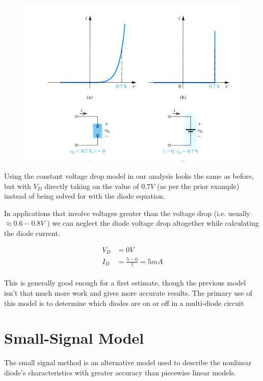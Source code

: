 \documentclass[../notes.tex]{subfiles}
\begin{document}
\begin{figure}[H]
	\centering
	\includegraphics[width=0.8\linewidth]{img/image_2022-09-16-22-49-19.png}
\end{figure}


Using the constant voltage drop model in our analysis looks the same as before, but with $ V_D $ directly taking on the value of $ 0.7V $ (as per the prior example) instead of being solved for with the diode equation.



In applications that involve voltages greater than the voltage drop (i.e. usually $ \approx 0.6-0.8V $  ) we can neglect the diode voltage drop altogether while calculating the diode current.

\begin{equation}
	\begin{split}
		V_D &= 0V \\
		 I_D &= \frac{5-0}{1} = 5mA  \\
	\end{split}
\end{equation}



This is generally good enough for a first estimate, though the previous model isn't that much more work and gives more accurate results.
The primary use of this model is to determine which diodes are on or off in a multi-diode circuit


\section{Small-Signal Model}


The small signal method is an alternative model used to describe the nonlinear diode's characteristics with greater accuracy than piecewise linear models.
\end{document}
